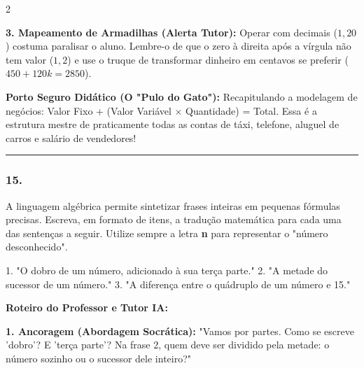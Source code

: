 \begin{multicols*}{2}
\begin{tcolorbox}[colback=CorTitUm!5, colframe=CorTitUm, boxrule=1pt, arc=4pt, left=6pt, right=6pt, top=6pt, bottom=6pt]
    \textbf{3. Mapeamento de Armadilhas (Alerta Tutor):} Operar com decimais ($1,20$) costuma paralisar o aluno. Lembre-o de que o zero à direita após a vírgula não tem valor ($1,2$) e use o truque de transformar dinheiro em centavos se preferir ($450 + 120k = 2850$).
    \end{tcolorbox}
    \vspace{0.15cm}
    
    \begin{boxexplicacao}
    \textbf{Porto Seguro Didático (O "Pulo do Gato"):} Recapitulando a modelagem de negócios: Valor Fixo + (Valor Variável $\times$ Quantidade) = Total. Essa é a estrutura mestre de praticamente todas as contas de táxi, telefone, aluguel de carros e salário de vendedores!
    \end{boxexplicacao}
\fi

\par\vspace{\espacoQuestao}


\noindent\textcolor{CorLinha}{\rule{\linewidth}{0.5pt}} 
\par\vspace{\espacoPreQuestao}
\subsubsection*{15.} 
\begin{enunciadoLiteral}
A linguagem algébrica permite sintetizar frases inteiras em pequenas fórmulas precisas. Escreva, em formato de itens, a tradução matemática para cada uma das sentenças a seguir. Utilize sempre a letra \textbf{n} para representar o "número desconhecido".

1. "O dobro de um número, adicionado à sua terça parte."
2. "A metade do sucessor de um número."
3. "A diferença entre o quádruplo de um número e 15."
\end{enunciadoLiteral}

\ifgabarito
    \begin{tcolorbox}[colback=CorTitUm!5, colframe=CorTitUm, boxrule=1pt, arc=4pt, left=6pt, right=6pt, top=6pt, bottom=6pt]
    \small\textbf{\textcolor{CorTitUm}{Roteiro do Professor e Tutor IA:}}\par\vspace{0.1cm}
    \color{CinzaEscuro}
    \textbf{1. Ancoragem (Abordagem Socrática):} "Vamos por partes. Como se escreve 'dobro'? E 'terça parte'? Na frase 2, quem deve ser dividido pela metade: o número sozinho ou o sucessor dele inteiro?"\par\vspace{0.1cm}
    

\end{tcolorbox}
\end{multicols*}
